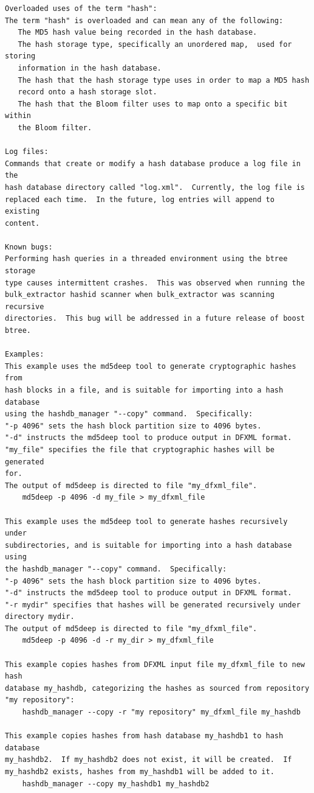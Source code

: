 \documentclass[11pt,twoside]{article}
\begin{document}
\begin{small}
\begin{verbatim}
Overloaded uses of the term "hash":
The term "hash" is overloaded and can mean any of the following:
   The MD5 hash value being recorded in the hash database.
   The hash storage type, specifically an unordered map,  used for storing
   information in the hash database.
   The hash that the hash storage type uses in order to map a MD5 hash
   record onto a hash storage slot.
   The hash that the Bloom filter uses to map onto a specific bit within
   the Bloom filter.

Log files:
Commands that create or modify a hash database produce a log file in the
hash database directory called "log.xml".  Currently, the log file is
replaced each time.  In the future, log entries will append to existing
content.

Known bugs:
Performing hash queries in a threaded environment using the btree storage
type causes intermittent crashes.  This was observed when running the
bulk_extractor hashid scanner when bulk_extractor was scanning recursive
directories.  This bug will be addressed in a future release of boost
btree.

Examples:
This example uses the md5deep tool to generate cryptographic hashes from
hash blocks in a file, and is suitable for importing into a hash database
using the hashdb_manager "--copy" command.  Specifically:
"-p 4096" sets the hash block partition size to 4096 bytes.
"-d" instructs the md5deep tool to produce output in DFXML format.
"my_file" specifies the file that cryptographic hashes will be generated
for.
The output of md5deep is directed to file "my_dfxml_file".
    md5deep -p 4096 -d my_file > my_dfxml_file

This example uses the md5deep tool to generate hashes recursively under
subdirectories, and is suitable for importing into a hash database using
the hashdb_manager "--copy" command.  Specifically:
"-p 4096" sets the hash block partition size to 4096 bytes.
"-d" instructs the md5deep tool to produce output in DFXML format.
"-r mydir" specifies that hashes will be generated recursively under
directory mydir.
The output of md5deep is directed to file "my_dfxml_file".
    md5deep -p 4096 -d -r my_dir > my_dfxml_file

This example copies hashes from DFXML input file my_dfxml_file to new hash
database my_hashdb, categorizing the hashes as sourced from repository
"my repository":
    hashdb_manager --copy -r "my repository" my_dfxml_file my_hashdb

This example copies hashes from hash database my_hashdb1 to hash database
my_hashdb2.  If my_hashdb2 does not exist, it will be created.  If
my_hashdb2 exists, hashes from my_hashdb1 will be added to it.
    hashdb_manager --copy my_hashdb1 my_hashdb2


\end{verbatim}
\end{small}
\end{document}
